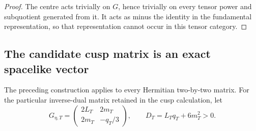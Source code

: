 \begin{proof}
The centre acts trivially on \(G\), hence trivially on every tensor power and
subquotient generated from it.  It acts as minus the identity in the
fundamental representation, so that representation cannot occur in this
tensor category.
\end{proof}

\subsection{The candidate cusp matrix is an exact spacelike vector}

The preceding construction applies to every Hermitian two-by-two matrix.  For
the particular inverse-dual matrix retained in the cusp calculation, let
\begin{equation}
 G_{\eta,T}=\begin{pmatrix}2L_T&2m_T\\2m_T&-q_T/3\end{pmatrix},
 \qquad D_T=L_T q_T+6m_T^2>0.
 \label{hnsp-candidate-matrix}
\end{equation}

